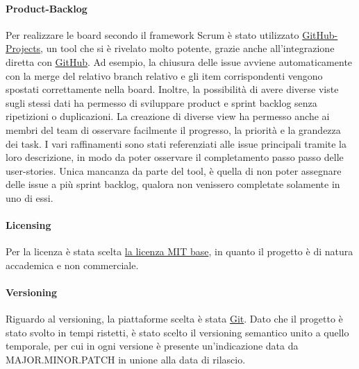     \paragraph{Product-Backlog} \label{chap:product-backlog}
    Per realizzare le board secondo il framework Scrum è stato utilizzato \href{https://github.com/orgs/ISIQuiz/projects/3}{GitHub-Projects}, un tool che si è rivelato molto potente, grazie anche all'integrazione diretta con \href{https://github.com}{GitHub}. Ad esempio, la chiusura delle issue avviene automaticamente con la merge del relativo branch relativo e gli item corrispondenti vengono spostati correttamente nella board. Inoltre, la possibilità di avere diverse viste sugli stessi dati ha permesso di sviluppare product e sprint backlog senza ripetizioni o duplicazioni. La creazione di diverse view ha permesso anche ai membri del team di osservare facilmente il progresso, la priorità e la grandezza dei task. I vari raffinamenti sono stati referenziati alle issue principali tramite la loro descrizione, in modo da poter osservare il completamento passo passo delle user-stories. Unica mancanza da parte del tool, è quella di non poter assegnare delle issue a più sprint backlog, qualora non venissero completate solamente in uno di essi.
    
    \paragraph{Licensing} 
    Per la licenza è stata scelta \href{https://choosealicense.com/licenses/}{la licenza MIT base}, in quanto il progetto è di natura accademica e non commerciale.
    
    \paragraph{Versioning}
    Riguardo al versioning, la piattaforme scelta è stata \href{https://git-scm.com}{Git}. Dato che il progetto è stato svolto in tempi ristetti, è stato scelto il versioning semantico unito a quello temporale, per cui in ogni versione è presente un'indicazione data da MAJOR.MINOR.PATCH in unione alla data di rilascio.
    
